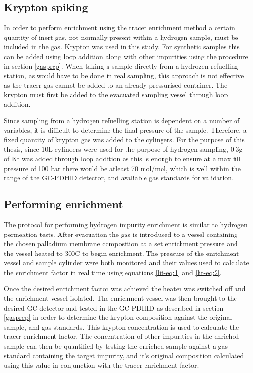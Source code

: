 \subsection{Krypton spiking}
In order to perform enrichment using the tracer enrichment method a certain quantity of inert gas, not normally present within a hydrogen sample, must be included in the gas. Krypton was used in this study. For synthetic samples this can be added using loop addition along with other impurities using the procedure in section \ref{gasprep}. When taking a sample directly from a hydrogen refuelling station, as would have to be done in real sampling, this approach is not effective as the tracer gas cannot be added to an already pressurised container. The krypton must first be added to the evacuated sampling vessel through loop addition.

Since sampling from a hydrogen refuelling station is dependent on a number of variables, it is difficult to determine the final pressure of the sample. Therefore, a fixed quantity of krypton gas was added to the cylingers. For the purpose of this thesis, since 10L cylinders were used for the purpose of hydrogen sampling, 0.3g of Kr was added through loop addition as this is enough to ensure at a max fill pressure of 100 bar there would be atleast 70 \textmu mol/mol, which is well within the range of the GC-PDHID detector, and avaliable gas standards for validation. 

\subsection{Performing enrichment}
The protocol for performing hydrogen impurity enrichment is similar to hydrogen permeation tests. After evacuation the gas is introduced to a vessel containing the chosen palladium membrane composition at a set enrichment pressure and the vessel heated to 300\textdegree C to begin enrichment. The pressure of the enrichment vessel and sample cylinder were both monitored and their values used to calculate the enrichment factor in real time using equations \ref{lit-eq:1} and \ref{lit-eq:2}. 

Once the desired enrichment factor was achieved the heater was switched off and the enrichment vessel isolated. The enrichment vessel was then brought to the desired GC detector and tested in the GC-PDHID as described in section \ref{gasprep} in order to determine the krypton composition against the original sample, and gas standards. This krypton concentration is used to calculate the tracer enrichment factor. The concentration of other impurities in the enriched sample can then be quantified by testing the enriched sample against a gas standard containing the target impurity, and it's original composition calculated using this value in conjunction with the tracer enrichment factor. 

